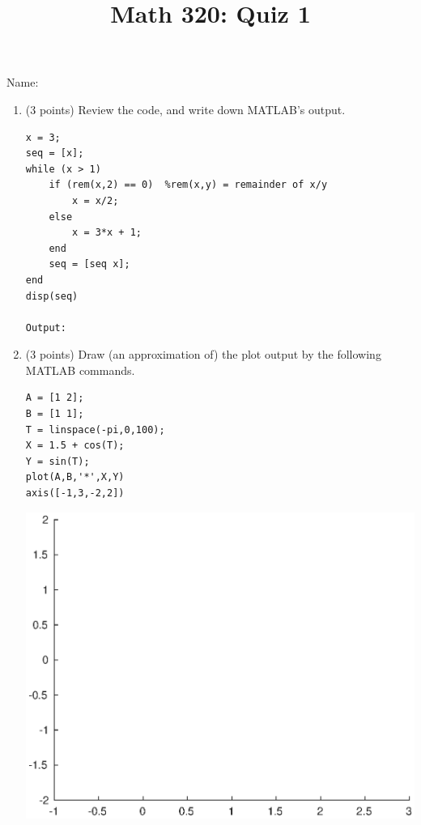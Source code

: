 \documentclass[12pt]{amsart}
\begin{document}
\flushright
Name:\underline{\hspace{5cm}}
\title{Math 320: Quiz 1}
\maketitle

\begin{enumerate}
\item (3 points) Review the code, and write down MATLAB's output.

\vspace{5mm}

\begin{verbatim} 
x = 3;
seq = [x];
while (x > 1)
    if (rem(x,2) == 0)  %rem(x,y) = remainder of x/y
        x = x/2;
    else
        x = 3*x + 1;
    end
    seq = [seq x];
end
disp(seq)

Output:
\end{verbatim}

\vspace{2cm}

\item (3 points) Draw (an approximation of) the plot output 
by the following MATLAB commands.

\begin{minipage}{.3\textwidth}
\begin{verbatim}
A = [1 2];
B = [1 1];
T = linspace(-pi,0,100);
X = 1.5 + cos(T);
Y = sin(T);
plot(A,B,'*',X,Y)
axis([-1,3,-2,2])
\end{verbatim}
\end{minipage}
\begin{minipage}{.6\textwidth}
\includegraphics[scale=.7]{quiz1p2.eps}
\end{minipage}


\end{enumerate}
\end{document}
